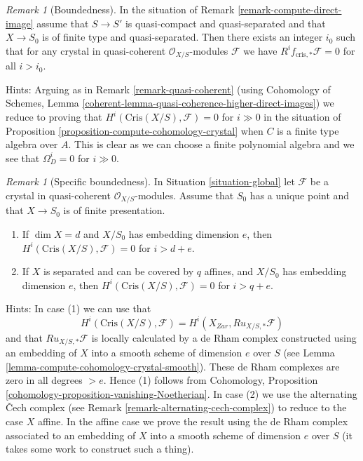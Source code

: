 \documentclass{stacks-project}
\theoremstyle{plain}
\theoremstyle{definition}
\theoremstyle{remark}
\newtheorem{remark}[subsection]{Remark}
\numberwithin{equation}{subsection}
\begin{document}
\begin{remark}[Boundedness]
\label{remark-bounded-cohomology}
In the situation of Remark \ref{remark-compute-direct-image}
assume that $S \to S'$ is quasi-compact and quasi-separated and
that $X \to S_0$ is of finite type and quasi-separated. Then there exists
an integer $i_0$ such that for any crystal
in quasi-coherent $\mathcal{O}_{X/S}$-modules $\mathcal{F}$
we have $R^if_{\text{cris}, *}\mathcal{F} = 0$ for all $i > i_0$.

\medskip\noindent
Hints: Arguing as in Remark \ref{remark-quasi-coherent} (using
Cohomology of Schemes, Lemma
\ref{coherent-lemma-quasi-coherence-higher-direct-images})
we reduce to proving that $H^i(\text{Cris}(X/S), \mathcal{F}) = 0$ for $i \gg 0$
in the situation of Proposition \ref{proposition-compute-cohomology-crystal}
when $C$ is a finite type algebra over $A$. This is clear as we can
choose a finite polynomial algebra and we see that $\Omega^i_D = 0$
for $i \gg 0$.
\end{remark}

\begin{remark}[Specific boundedness]
\label{remark-bounded-cohomology-over-point}
In Situation \ref{situation-global} let $\mathcal{F}$ be a crystal in
quasi-coherent $\mathcal{O}_{X/S}$-modules. Assume that $S_0$
has a unique point and that $X \to S_0$ is of finite presentation.
\begin{enumerate}
\item If $\dim X = d$ and $X/S_0$ has embedding dimension $e$, then
$H^i(\text{Cris}(X/S), \mathcal{F}) = 0$ for $i > d + e$.
\item If $X$ is separated and can be covered by $q$ affines, and
$X/S_0$ has embedding dimension $e$, then
$H^i(\text{Cris}(X/S), \mathcal{F}) = 0$ for $i > q + e$.
\end{enumerate}
Hints: In case (1) we can use that
$$
H^i(\text{Cris}(X/S), \mathcal{F}) = H^i(X_{Zar}, Ru_{X/S, *}\mathcal{F})
$$
and that $Ru_{X/S, *}\mathcal{F}$ is locally calculated by a de Rham
complex constructed using an embedding of $X$ into a smooth scheme
of dimension $e$ over $S$
(see Lemma \ref{lemma-compute-cohomology-crystal-smooth}).
These de Rham complexes are zero in all degrees $> e$. Hence (1)
follows from Cohomology, Proposition
\ref{cohomology-proposition-vanishing-Noetherian}.
In case (2) we use the alternating {\v C}ech complex (see
Remark \ref{remark-alternating-cech-complex}) to reduce to the case
$X$ affine. In the affine case we prove the result using the de Rham complex
associated to an embedding of $X$ into a smooth scheme of dimension $e$
over $S$ (it takes some work to construct such a thing).
\end{remark}
\end{document}
